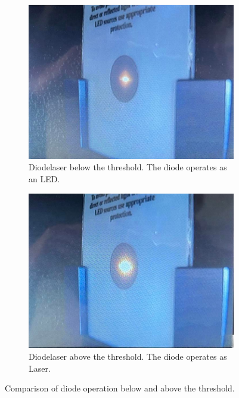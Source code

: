 \begin{figure}
    \centering
    \begin{subfigure}{0.45\textwidth}
      \centering
      \includegraphics[width=\textwidth]{pictures/LED.jpeg}
      \caption{Diodelaser below the threshold. The diode operates as an LED.}
      \label{fig:a}
    \end{subfigure}
    \hfill
    \begin{subfigure}{0.45\textwidth}
      \centering
      \includegraphics[width=\textwidth]{pictures/Laser.jpeg}
      \caption{Diodelaser above the threshold. The diode operates as Laser.}
      \label{fig:b}
    \end{subfigure}
    \caption{Comparison of diode operation below and above the threshold.}
    \label{fig:threshold}
\end{figure}

